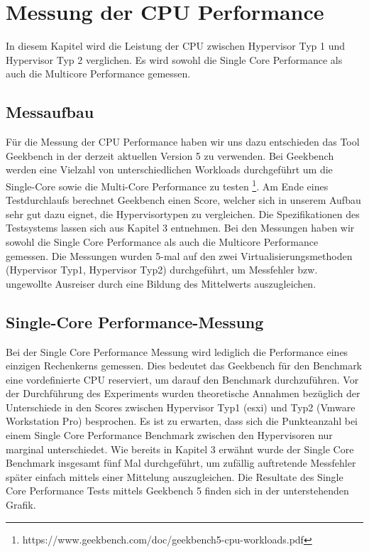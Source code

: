 \documentclass[conference]{IEEEtran}
\begin{document}
\section{Messung der CPU Performance}
\label{Messung der CPU Performance}
In diesem Kapitel wird die Leistung der CPU zwischen Hypervisor Typ 1 und Hypervisor Typ 2 verglichen. Es wird sowohl die Single Core Performance als auch die Multicore Performance gemessen.

\subsection{Messaufbau}
Für die Messung der CPU Performance haben wir uns dazu entschieden das Tool Geekbench in der derzeit aktuellen Version 5 zu verwenden. Bei Geekbench werden eine Vielzahl von unterschiedlichen Workloads durchgeführt um die Single-Core sowie die Multi-Core Performance zu testen \footnote{https://www.geekbench.com/doc/geekbench5-cpu-workloads.pdf}. Am Ende eines Testdurchlaufs berechnet Geekbench einen Score, welcher sich in unserem Aufbau sehr gut dazu eignet, die Hypervisortypen zu vergleichen. Die Spezifikationen des Testsystems lassen sich aus Kapitel 3 entnehmen.
Bei den Messungen haben wir sowohl die Single Core Performance als auch die Multicore Performance gemessen.  Die Messungen wurden 5-mal auf den zwei Virtualisierungsmethoden (Hypervisor Typ1, Hypervisor Typ2) durchgeführt, um Messfehler bzw. ungewollte Ausreiser durch eine Bildung des Mittelwerts auszugleichen.


\subsection{Single-Core Performance-Messung}
Bei der Single Core Performance Messung wird lediglich die Performance eines einzigen Rechenkerns gemessen. Dies bedeutet das Geekbench für den Benchmark eine vordefinierte CPU reserviert, um darauf den Benchmark durchzuführen. Vor der Durchführung des Experiments wurden theoretische Annahmen bezüglich der Unterschiede in den Scores zwischen Hypervisor Typ1 (esxi) und Typ2 (Vmware Workstation Pro) besprochen. Es ist zu erwarten, dass sich die Punkteanzahl bei einem Single Core Performance Benchmark zwischen den Hypervisoren nur marginal unterschiedet.
Wie bereits in Kapitel 3 erwähnt wurde der Single Core Benchmark insgesamt fünf Mal durchgeführt, um zufällig auftretende Messfehler später einfach mittels einer Mittelung auszugleichen. Die Resultate des Single Core Performance Tests mittels Geekbench 5 finden sich in der unterstehenden Grafik. \newline 
\end{document}
